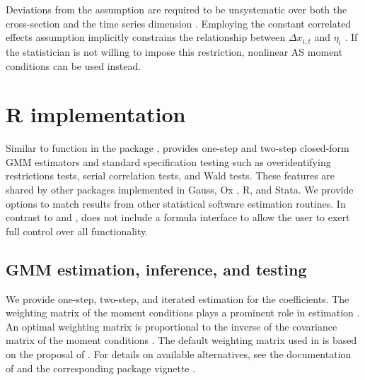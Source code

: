 Deviations from the assumption are required to be unsystematic over both the cross-section and the time series dimension \citep[see Section 6.5 in][which also provides an empirically relevant example]{Are2003}.
Employing the constant correlated effects assumption implicitly constrains the relationship between $\Delta x_{i,t}$ and $\eta_i$ \citep[see][]{BluBonWin2001}. If the statistician is not willing to impose this restriction, nonlinear AS moment conditions can be used instead.





















\section{R implementation}\label{Sec:R}
Similar to function  in the package ,  provides one-step and two-step closed-form GMM estimators and standard specification testing such as overidentifying restrictions tests, serial correlation tests, and Wald tests. These features are shared by other packages implemented in Gauss, Ox \citep{DooAreBon2012dpd}, R, and Stata. We provide options to match results from other statistical software estimation routines. In contrast to  and ,  does not include a formula interface to allow the user to exert full control over all functionality.





\subsection{GMM estimation, inference, and testing}
We provide one-step, two-step, and iterated estimation for the coefficients.
The weighting matrix of the moment conditions plays a prominent role in estimation \citep{AreBon1991,BluBonWin2001,Kri2019}. An optimal weighting matrix is proportional to the inverse of the covariance matrix of the moment conditions \citep[see, e.g.,][]{Are2003}.
The default weighting matrix used in  is based on the proposal of \citet{AreBon1991}. For details on available alternatives, see the documentation of  and the corresponding package vignette \citep{FriPuaSchn2020}.

